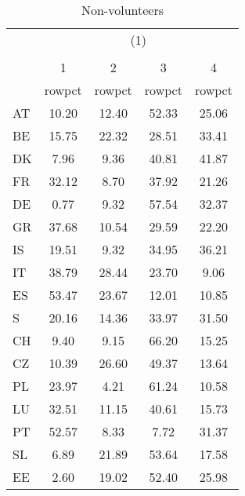 \begin{table}[htbp]\centering
\def\sym#1{\ifmmode^{#1}\else\(^{#1}\)\fi}
\caption{Non-volunteers}
\begin{tabular}{l*{4}{c}}
\hline\hline
            &\multicolumn{4}{c}{(1)}                            \\
            &\multicolumn{4}{c}{}                               \\
            &           1&           2&           3&           4\\
            &      rowpct&      rowpct&      rowpct&      rowpct\\
\hline
AT          &       10.20&       12.40&       52.33&       25.06\\
BE          &       15.75&       22.32&       28.51&       33.41\\
DK          &        7.96&        9.36&       40.81&       41.87\\
FR          &       32.12&        8.70&       37.92&       21.26\\
DE          &        0.77&        9.32&       57.54&       32.37\\
GR          &       37.68&       10.54&       29.59&       22.20\\
IS          &       19.51&        9.32&       34.95&       36.21\\
IT          &       38.79&       28.44&       23.70&        9.06\\
ES          &       53.47&       23.67&       12.01&       10.85\\
S           &       20.16&       14.36&       33.97&       31.50\\
CH          &        9.40&        9.15&       66.20&       15.25\\
CZ          &       10.39&       26.60&       49.37&       13.64\\
PL          &       23.97&        4.21&       61.24&       10.58\\
LU          &       32.51&       11.15&       40.61&       15.73\\
PT          &       52.57&        8.33&        7.72&       31.37\\
SL          &        6.89&       21.89&       53.64&       17.58\\
EE          &        2.60&       19.02&       52.40&       25.98\\
\hline\hline
\end{tabular}
\end{table}
